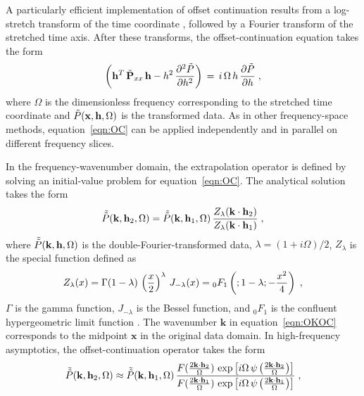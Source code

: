 A particularly efficient implementation of offset continuation results
from a log-stretch transform of the time coordinate
\cite[]{Bolondi82}, followed by a Fourier transform of the stretched
time axis. After these transforms, the offset-continuation equation
takes the form
\begin{equation}
\label{eqn:OC}
\left( \mathbf{h}^T\,\Tilde{\mathbf{P}}_{xx}\,\mathbf{h} - 
  h^2\,\frac{\partial^2 \Tilde{P}}{\partial h^2} \right) \, = \, 
i\,\Omega\,h\,\frac{\partial \Tilde{P}}{\partial h} \;,
\end{equation}
where $\Omega$ is the dimensionless frequency corresponding to the
stretched time coordinate and $\Tilde{P}
(\mathbf{x},\mathbf{h},\Omega)$ is the transformed data. As in other
frequency-space methods, equation~\ref{eqn:OC} can be applied
independently and in parallel on different frequency slices.
\par
In the frequency-wavenumber domain, the extrapolation operator is
defined by solving an initial-value problem for
equation~\ref{eqn:OC}. The analytical solution takes the form
\begin{equation}
  \Tilde{\Tilde{P}}(\mathbf{k},\mathbf{h}_2,\Omega) = 
  \Tilde{\Tilde{P}}(\mathbf{k},\mathbf{h}_1,\Omega)\,
  \frac{Z_{\lambda}(\mathbf{k} \cdot \mathbf{h}_2)}{Z_{\lambda}(\mathbf{k} 
  \cdot \mathbf{h}_1)}\;,
\label{eqn:OKOC}
\end{equation}
where $\Tilde{\Tilde{P}}(\mathbf{k},\mathbf{h},\Omega)$ 
is the double-Fourier-transformed
data, $\lambda = (1 + i \Omega)/2$, $Z_\lambda$ is the special
function defined as
\begin{equation}
Z_{\lambda}(x) = \Gamma(1-\lambda)\,\left(x \over 2\right)^{\lambda}\,
J_{-\lambda}(x)=
{}_0F_1\left(;1-\lambda;-\frac{x^2}{4}\right)\;,
\label{eqn:z}
\end{equation}
$\Gamma$ is the gamma function, $J_{-\lambda}$ is the Bessel function,
and ${}_0F_1$ is the confluent hypergeometric limit function \cite[]{ab}. The
wavenumber $\mathbf{k}$ in equation~\ref{eqn:OKOC} corresponds to the
midpoint $\mathbf{x}$ in the original data domain. In high-frequency
asymptotics, the offset-continuation operator takes the form
\begin{equation}
  \Tilde{\Tilde{P}}(\mathbf{k},\mathbf{h}_2,\Omega) 
  \approx \Tilde{\Tilde{P}}(\mathbf{k},\mathbf{h}_1,\Omega)\,
\frac
{F(\frac{2 \mathbf{k} \cdot \mathbf{h}_2}{\Omega})\,
  \exp{\left[i\Omega\,\psi\left(\frac{2 \mathbf{k} \cdot \mathbf{h}_2}{\Omega}\right)
    \right]}}
{F(\frac{2 \mathbf{k} \cdot \mathbf{h}_1}{\Omega})\,
 \exp{\left[i\Omega\,\psi\left(\frac{2 \mathbf{k} \cdot \mathbf{h}_1}{\Omega}\right)\right]}}\;,
\label{eqn:AOKOC}
\end{equation}
